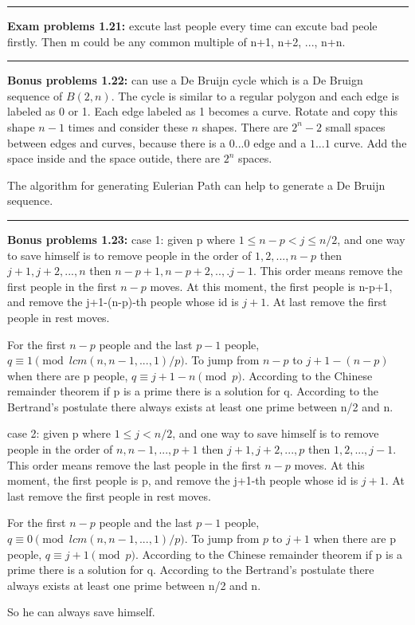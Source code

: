 \documentclass{article}
\newcommand{\insertcode}[2]{\begin{itemize}\item[]\end{itemize}}
\begin{document}
\noindent\rule{\textwidth}{0.4pt}
\textbf{Exam problems 1.21:}
excute last people every time can excute bad peole firstly.
Then m could be any common multiple of n+1, n+2, ..., n+n.

\noindent\rule{\textwidth}{0.4pt}
\textbf{Bonus problems 1.22:}
can use a De Bruijn cycle which is a De Bruign sequence of $B(2,n)$.
The cycle is similar to a regular polygon and each edge is labeled as 0 or 1.
Each edge labeled as 1 becomes a curve.
Rotate and copy this shape $n-1$ times and consider these $n$ shapes.
There are $2^n-2$ small spaces between edges and curves, because there is a $0...0$ edge and a $1...1$ curve.
Add the space inside and the space outide, there are $2^n$ spaces.

The algorithm for generating Eulerian Path can help to generate a De Bruijn sequence.

\noindent\rule{\textwidth}{0.4pt}
\textbf{Bonus problems 1.23:}
case 1: given p where $1\le n - p < j \le n/2$, and one way to save himself is to remove people in the order of $1,2,...,n-p$ then $j+1,j+2,...,n$ then $n-p+1,n-p+2,..,.j-1$.
This order means remove the first people in the first $n-p$ moves.
At this moment, the first people is n-p+1, and remove the j+1-(n-p)-th people whose id is $j+1$.
At last remove the first people in rest moves.


For the first $n-p$ people and the last $p-1$ people, $q \equiv 1 \pmod{lcm(n,n-1,...,1)/p}$.
To jump from $n-p$ to $j+1-(n-p)$ when there are p people, $q \equiv j+1-n \pmod{p}$.
According to the Chinese remainder theorem if p is a prime there is a solution for q.
According to the Bertrand's postulate there always exists at least one prime between n/2 and n.


case 2: given p where $1\le j < n/2$, and one way to save himself is to remove people in the order of $n,n-1,...,p+1$ then $j+1,j+2,...,p$ then $1,2,...,j-1$.
This order means remove the last people in the first $n-p$ moves.
At this moment, the first people is p, and remove the j+1-th people whose id is $j+1$.
At last remove the first people in rest moves.


For the first $n-p$ people and the last $p-1$ people, $q \equiv 0 \pmod{lcm(n,n-1,...,1)/p}$.
To jump from $p$ to $j+1$ when there are p people, $q \equiv j+1 \pmod{p}$.
According to the Chinese remainder theorem if p is a prime there is a solution for q.
According to the Bertrand's postulate there always exists at least one prime between n/2 and n.


So he can always save himself.

\end{document}
